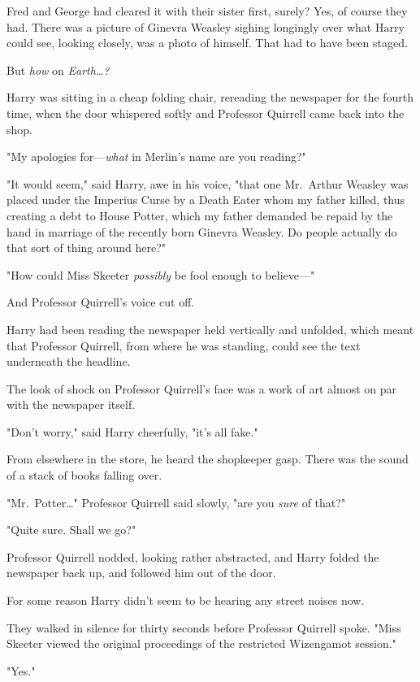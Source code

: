Fred and George had cleared it with their sister first, surely? Yes, of course 
they had. There was a picture of Ginevra Weasley sighing longingly over what 
Harry could see, looking closely, was a photo of himself. That had to have been 
staged.

But \emph{how} on \emph{Earth{\ldots}?}

Harry was sitting in a cheap folding chair, rereading the newspaper for the 
fourth time, when the door whispered softly and Professor Quirrell came back 
into the shop.

"My apologies for---\emph{what} in Merlin's name are you reading?"

"It would seem," said Harry, awe in his voice, "that one Mr.~Arthur Weasley was 
placed under the Imperius Curse by a Death Eater whom my father killed, thus 
creating a debt to House Potter, which my father demanded be repaid by the hand 
in marriage of the recently born Ginevra Weasley. Do people actually do that 
sort of thing around here?"

"How could Miss Skeeter \emph{possibly} be fool enough to believe---"

And Professor Quirrell's voice cut off.

Harry had been reading the newspaper held vertically and unfolded, which meant 
that Professor Quirrell, from where he was standing, could see the text 
underneath the headline.

The look of shock on Professor Quirrell's face was a work of art almost on par 
with the newspaper itself.

"Don't worry," said Harry cheerfully, "it's all fake."

From elsewhere in the store, he heard the shopkeeper gasp. There was the sound 
of a stack of books falling over.

"Mr.~Potter{\ldots}" Professor Quirrell said slowly, "are you \emph{sure} of 
that?"

"Quite sure. Shall we go?"

Professor Quirrell nodded, looking rather abstracted, and Harry folded the 
newspaper back up, and followed him out of the door.

For some reason Harry didn't seem to be hearing any street noises now.

They walked in silence for thirty seconds before Professor Quirrell spoke. 
"Miss Skeeter viewed the original proceedings of the restricted Wizengamot 
session."

"Yes."

